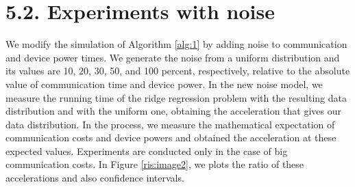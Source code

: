 \documentclass{article}
\theoremstyle{definition}
\theoremstyle{plain}
\begin{document}



\section*{5.2. Experiments with noise}

We modify the simulation of Algorithm \ref{alg:1} by adding noise to communication and device power times. We generate the noise from a uniform distribution and its values are 10, 20, 30, 50, and 100 percent, respectively, relative to the absolute value of communication time and device power. In the new noise model, we measure the running time of the ridge regression problem with the resulting data distribution and with the uniform one, obtaining the acceleration that gives our data distribution. In the process, we measure the mathematical expectation of communication costs and device powers and obtained the acceleration at these expected values. Experiments are conducted only in the case of big communication costs. In Figure \ref{ris:image2}, we plots the ratio of these accelerations and also confidence intervals.
\end{document}
